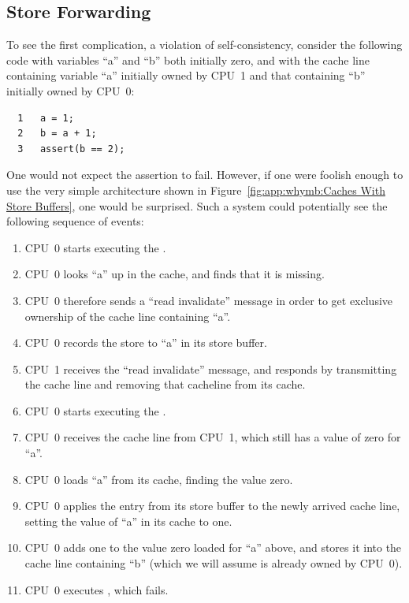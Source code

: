\subsection{Store Forwarding}
\label{sec:app:whymb:Store Forwarding}

To see the first complication, a violation of self-consistency,
consider the following code with variables ``a'' and ``b'' both initially
zero, and with the cache line containing variable ``a'' initially
owned by CPU~1 and that containing ``b'' initially owned by CPU~0:

\vspace{5pt}
\begin{minipage}[t]{\columnwidth}
\small
\begin{verbatim}
  1   a = 1;
  2   b = a + 1;
  3   assert(b == 2);
\end{verbatim}
\end{minipage}
\vspace{5pt}

One would not expect the assertion to fail.
However, if one were foolish enough to use the very simple architecture
shown in
Figure~\ref{fig:app:whymb:Caches With Store Buffers},
one would be surprised.
Such a system could potentially see the following sequence of events:
\begin{enumerate}
\item	CPU~0 starts executing the .
\item	CPU~0 looks ``a'' up in the cache, and finds that it is missing.
\item	CPU~0 therefore sends a ``read invalidate'' message in order to
	get exclusive ownership of the cache line containing ``a''.
\item	CPU~0 records the store to ``a'' in its store buffer.
\item	CPU~1 receives the ``read invalidate'' message, and responds
	by transmitting the cache line and removing that cacheline from
	its cache.
\item	CPU~0 starts executing the .
\item	CPU~0 receives the cache line from CPU~1, which still has
	a value of zero for ``a''.
\item	CPU~0 loads ``a'' from its cache, finding the value zero.
	\label{item:app:whymb:Need Store Buffer}
\item	CPU~0 applies the entry from its store buffer to the newly
	arrived cache line, setting the value of ``a'' in its cache
	to one.
\item	CPU~0 adds one to the value zero loaded for ``a'' above,
	and stores it into the cache line containing ``b''
	(which we will assume is already owned by CPU~0).
\item	CPU~0 executes , which fails.
\end{enumerate}

